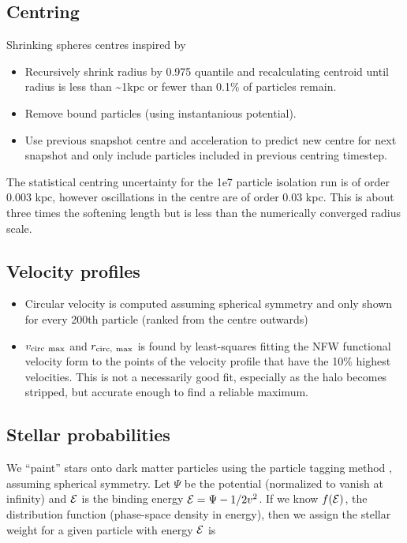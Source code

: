 \subsection{Centring}\label{sec:shrinking_spheres}

Shrinking spheres centres inspired by \citet{power+2003}

\begin{itemize}
\tightlist
\item
  Recursively shrink radius by 0.975 quantile and recalculating centroid
  until radius is less than \textasciitilde1kpc or fewer than 0.1\% of
  particles remain.
\item
  Remove bound particles (using instantanious potential).
\item
  Use previous snapshot centre and acceleration to predict new centre
  for next snapshot and only include particles included in previous
  centring timestep.
\end{itemize}

The statistical centring uncertainty for the 1e7 particle isolation run
is of order 0.003 kpc, however oscillations in the centre are of order
0.03 kpc. This is about three times the softening length but is less
than the numerically converged radius scale.

\subsection{Velocity profiles}\label{velocity-profiles}

\begin{itemize}
\tightlist
\item
  Circular velocity is computed assuming spherical symmetry and only
  shown for every 200th particle (ranked from the centre outwards)
\item
  \(v_{\rm circ\ max}\) and \(r_{\rm circ,\ max}\) is found by
  least-squares fitting the NFW functional velocity form to the points
  of the velocity profile that have the 10\% highest velocities. This is
  not a necessarily good fit, especially as the halo becomes stripped,
  but accurate enough to find a reliable maximum.
\end{itemize}

\subsection{Stellar probabilities}\label{stellar-probabilities}

We ``paint'' stars onto dark matter particles using the particle tagging
method \citep[e.g.][]{bullock+johnston2005}, assuming spherical
symmetry. Let \(\Psi\) be the potential (normalized to vanish at
infinity) and \({\cal E}\) is the binding energy
\({\cal E} = \Psi - 1/2 v^2\). If we know \(f({\cal E})\), the
distribution function (phase-space density in energy), then we assign
the stellar weight for a given particle with energy \({\cal E}\) is

